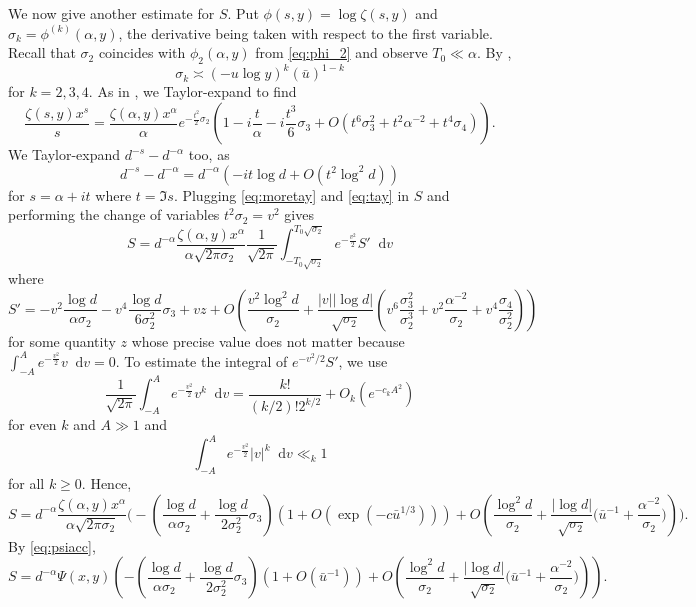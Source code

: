\documentclass{amsart}
\theoremstyle{plain}
\theoremstyle{remark}
\newcommand*\diff{\mathop{}\!\mathrm{d}}
\newcommand{\ubar}{\bar{u}}
\begin{document}
We now give another estimate for $S$.
Put $\phi(s,y)=\log \zeta(s,y)$ and $\sigma_k=\phi^{(k)}(\alpha,y)$, the derivative being taken with respect to the first variable. Recall that $\sigma_2$ coincides with $\phi_2(\alpha,y)$ from \eqref{eq:phi_2} and observe $T_0 \ll \alpha$. By \cite[Lem.~4]{HildebrandTenenbaum1986},
\[\sigma_k \asymp (-u \log y)^k (\ubar)^{1-k}\]
for $k=2,3,4$. As in \cite[p.~280]{HildebrandTenenbaum1986}, we Taylor-expand to find
\begin{equation}\label{eq:tay} \frac{\zeta(s,y)x^{s}}{s} = \frac{\zeta(\alpha,y)x^{\alpha}}{\alpha} e^{-\frac{t^2}{2}\sigma_2 } \left(1-i\frac{t}{\alpha}-i\frac{t^3}{6}\sigma_3 + O(t^6 \sigma_3^2 +t^2 \alpha^{-2} +t^4 \sigma_4 )\right).
\end{equation}
We Taylor-expand $d^{-s}-d^{-\alpha}$ too, as
\begin{equation}\label{eq:moretay} d^{-s}-d^{-\alpha}=d^{-\alpha}(-it\log d  +O(t^2\log^2 d))
\end{equation}
for $s=\alpha+it$ where $t= \Im s$.
Plugging \eqref{eq:moretay} and \eqref{eq:tay} in $S$ and performing the change of variables $t^2 \sigma_2 = v^2$ gives
\[ S = d^{-\alpha}\frac{\zeta(\alpha,y)x^{\alpha}}{\alpha\sqrt{2\pi \sigma_2}} \frac{1}{\sqrt{2\pi}}\int_{-T_0\sqrt{\sigma_2}}^{T_0\sqrt{\sigma_2}} e^{-\frac{v^2}{2}} S' \diff{v} \]
where
\[S' =-v^2\frac{\log d}{\alpha \sigma_2} - v^4\frac{ \log d }{6\sigma_2^2}\sigma_3+v z+ O\left( \frac{v^2 \log ^2 d}{\sigma_2} + \frac{|v| |\log d|}{\sqrt{\sigma_2}}\left(v^6 \frac{\sigma_3^2}{\sigma_2^3} + v^2 \frac{\alpha^{-2}}{\sigma_2} + v^4\frac{ \sigma_4}{\sigma_2^2}\right)\right)\]
for some quantity $z$ whose precise value does not matter because $\int_{-A}^{A} e^{-\frac{v^2}{2}}v \diff{v} = 0$. To estimate the integral of $e^{-v^2/2}S'$, we use 
\begin{equation}\label{eq:intest}
	\frac{1}{\sqrt{2\pi}} \int_{-A}^{A} e^{-\frac{v^2}{2}}v^k \diff{v} = \frac{k!}{(k/2)!2^{k/2}}+ O_k(e^{-c_k A^2})
\end{equation}
for even $k$ and $A \gg 1$ and 
\[	\int_{-A}^{A} e^{-\frac{v^2}{2}}|v|^k \diff{v} \ll_k 1  \]
for all $k \ge 0$. Hence,
\[	S = d^{-\alpha} \frac{\zeta(\alpha,y)x^{\alpha}}{\alpha\sqrt{2\pi \sigma_2}} \bigg( -\left(\frac{\log d}{\alpha \sigma_2}+ \frac{\log d }{2\sigma_2^2}\sigma_3\right) (1+O(\exp(-c\ubar^{1/3}))) + O\left( \frac{\log^2 d}{\sigma_2}+ \frac{|\log d|}{\sqrt{\sigma_2}} \big( \ubar^{-1} +\frac{ \alpha^{-2}}{\sigma_2}\big)\right)\bigg). \]
By \eqref{eq:psiacc}, 
\[	S= d^{-\alpha} \Psi(x,y) \left( -\left(\frac{\log d}{\alpha \sigma_2}+ \frac{\log d }{2\sigma_2^2}\sigma_3\right) (1+O(\ubar^{-1} )) + O\left( \frac{\log^2 d}{\sigma_2}+\frac{|\log d|}{\sqrt{\sigma_2}} \big( \ubar^{-1} + \frac{\alpha^{-2}}{\sigma_2}\big)\right)\right). \]
\end{document}
